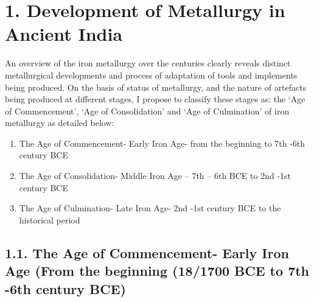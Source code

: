 \section*{1. Development of Metallurgy in Ancient India}

An overview of the iron metallurgy over the centuries clearly reveals distinct metallurgical developments and process of adaptation of tools and implements being produced. On the basis of status of metallurgy, and the nature of artefacts being produced at different stages, I propose to classify these stages as: the ‘Age of Commencement’, ‘Age of Consolidation’ and ‘Age of Culmination’ of iron metallurgy as detailed below:

\begin{enumerate}
\item The Age of Commencement- Early Iron Age- from the beginning to 7th -6th century BCE

 \item The Age of Consolidation- Middle Iron Age – 7th – 6th BCE to 2nd -1st century BCE

 \item The Age of Culmination- Late Iron Age- 2nd -1st century BCE to the historical period

\end{enumerate}


\subsection*{1.1. The Age of Commencement- Early Iron Age (From the beginning (18/1700 BCE to 7th -6th century BCE)}

